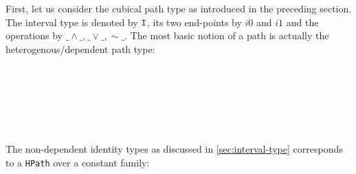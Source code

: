 First, let us consider the cubical path type as introduced in the preceding
section. The interval type is denoted by $\texttt{I}$, its two end-points by $i0$ and
$i1$ and the operations by $\_\land\_, \_\lor\_, \sim\_$. The most basic notion
of a path is actually the heterogenous/dependent path type:
\begin{code}[hide]%
\>[0]\AgdaSpace{}%
\AgdaSpace{}%
\<%
\\
\>[0][@{}l@{\AgdaIndent{0}}]%
\>[2]\AgdaSymbol{(}\AgdaSymbol{)}\<%
\\
\>[0]\AgdaSpace{}%
\AgdaSpace{}%
\<%
\\
\>[0]\<%
\\
\>[0][@{}l@{\AgdaIndent{0}}]%
\>[2]\AgdaSpace{}%
\AgdaSymbol{:}\AgdaSpace{}%
\<%
\\
\>[0]\<%
\end{code}
\begin{code}%
\>[0][@{}l@{\AgdaIndent{1}}]%
\>[2]\AgdaSpace{}%
\AgdaSymbol{:}\AgdaSpace{}%
\AgdaSymbol{(}\AgdaSpace{}%
\AgdaSymbol{:}\AgdaSpace{}%
\AgdaSpace{}%
\AgdaSpace{}%
\AgdaSymbol{)}\AgdaSpace{}%
\AgdaSpace{}%
\AgdaSpace{}%
\AgdaSpace{}%
\AgdaSpace{}%
\AgdaSpace{}%
\AgdaSpace{}%
\AgdaSpace{}%
\<%
\end{code}
The non-dependent identity types as discussed in \autoref{sec:interval-type}
corresponds to a \texttt{HPath} over a constant family:
\begin{code}%
\>[0]\AgdaSpace{}%
\AgdaSymbol{:}\AgdaSpace{}%
\AgdaSymbol{\{}\AgdaSpace{}%
\AgdaSymbol{:}\AgdaSpace{}%
\AgdaSymbol{\}}\AgdaSpace{}%
\AgdaSpace{}%
\AgdaSpace{}%
\AgdaSpace{}%
\AgdaSpace{}%
\AgdaSpace{}%
\<%
\\
\>[0]\AgdaSpace{}%
\AgdaSymbol{\{}\AgdaSymbol{\}}\AgdaSpace{}%
\AgdaSpace{}%
\AgdaSpace{}%
\AgdaSymbol{=}\AgdaSpace{}%
\AgdaSpace{}%
\AgdaSpace{}%
\AgdaBound{\AgdaUnderscore{}}\AgdaSpace{}%
\AgdaSpace{}%
\AgdaSymbol{)}\AgdaSpace{}%
\AgdaSpace{}%
\<%
\end{code}

